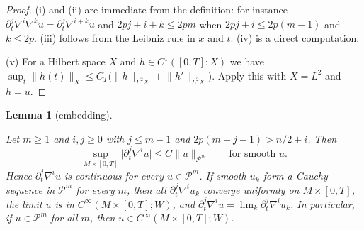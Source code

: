 \documentclass[11pt,reqno]{amsart}
\newtheorem{lemma}[theorem]{Lemma}
\theoremstyle{definition}
\theoremstyle{remark}
\newcommand{\Pp}{\mathcal{P}}
\newcommand{\norm}[1]{\lVert #1\rVert}
\newcommand{\abs}[1]{\lvert #1\rvert}
\newcommand{\lean}[1]{}
\newcommand{\uses}[1]{}
\numberwithin{equation}{section}
\begin{document}
\begin{proof}
(i) and (ii) are immediate from the definition: for instance
$\partial_t^j\nabla^i\nabla^ku=\partial_t^j\nabla^{i+k}u$ and $2pj+i+k\le2pm$ when
$2pj+i\le2p(m-1)$ and $k\le2p$. (iii) follows from the Leibniz rule in $x$ and $t$. (iv) is a direct
computation.

(v) For a Hilbert space $X$ and $h\in C^1([0,T];X)$ we have
$\sup_t\norm{h(t)}_X\le C_T\bigl(\norm h_{L^2X}+\norm{h'}_{L^2X}\bigr)$. Apply this with $X=L^2$ and
$h=u$.
\end{proof}

\begin{lemma}[embedding]\label{lem:embedding}
\lean{ShortTime.exists_fiberNormSq_le_parabolicInner, ShortTime.good_of_parabolic, ShortTime.rawJoint_limSec, ShortTime.jointlySmoothOn_limFam, ShortTime.jet_limFam, ShortTime.contDiffOn_limChart, ShortTime.ParabolicSpace.eq_zero_of_evalJet_eq_zero, ShortTime.ParabolicSpace.eq_ofSmooth_of_evalJet_eq}
\uses{lem:parabolic-basic, fact:sobolev}
Let $m\ge1$ and $i,j\ge0$ with $j\le m-1$ and $2p(m-j-1)>n/2+i$. Then
\[
  \sup_{M\times[0,T]}\abs{\partial_t^j\nabla^iu}\le C\norm{u}_{\Pp^m}\qquad\text{for smooth }u .
\]
Hence $\partial_t^j\nabla^iu$ is continuous for every $u\in\Pp^m$. If smooth $u_k$ form a Cauchy
sequence in $\Pp^m$ for every $m$, then all $\partial_t^j\nabla^iu_k$ converge uniformly on
$M\times[0,T]$, the limit $u$ is in $C^\infty(M\times[0,T];W)$, and
$\partial_t^j\nabla^iu=\lim_k\partial_t^j\nabla^iu_k$. In particular, if $u\in\Pp^m$ for all $m$, then
$u\in C^\infty(M\times[0,T];W)$.
\end{lemma}
\end{document}
